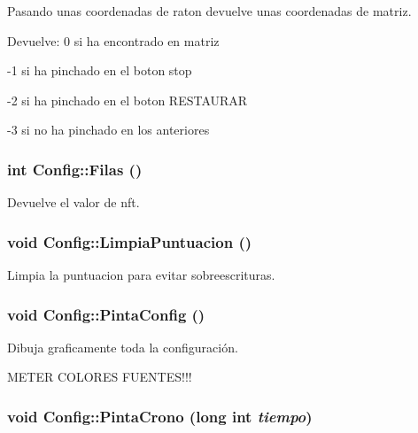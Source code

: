 Pasando unas coordenadas de raton devuelve unas coordenadas de matriz. 

\begin{Desc}
\item[Devuelve:]0 si ha encontrado en matriz 

-1 si ha pinchado en el boton stop 

-2 si ha pinchado en el boton RESTAURAR 

-3 si no ha pinchado en los anteriores \end{Desc}
\hypertarget{class_config_63b35552c2db0e6bfadf386a6df6cc8b}{
\subsubsection[{Filas}]{\setlength{\rightskip}{0pt plus 5cm}int Config::Filas ()}}
\label{class_config_63b35552c2db0e6bfadf386a6df6cc8b}


Devuelve el valor de nft. 

\hypertarget{class_config_41b3ad0b583abb4dcd8a0119d5bdb166}{
\subsubsection[{LimpiaPuntuacion}]{\setlength{\rightskip}{0pt plus 5cm}void Config::LimpiaPuntuacion ()}}
\label{class_config_41b3ad0b583abb4dcd8a0119d5bdb166}


Limpia la puntuacion para evitar sobreescrituras. 

\hypertarget{class_config_38a07e218d50496b9b93e5bd4ab9956f}{
\subsubsection[{PintaConfig}]{\setlength{\rightskip}{0pt plus 5cm}void Config::PintaConfig ()}}
\label{class_config_38a07e218d50496b9b93e5bd4ab9956f}


Dibuja graficamente toda la configuración. 



METER COLORES FUENTES!!! \hypertarget{class_config_584298fc8c9442a2be186d3a39776859}{
\subsubsection[{PintaCrono}]{\setlength{\rightskip}{0pt plus 5cm}void Config::PintaCrono (long int {\em tiempo})}}
\label{class_config_584298fc8c9442a2be186d3a39776859}


